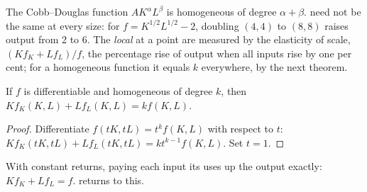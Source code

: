 The Cobb--Douglas function $AK^\alpha L^\beta$ is homogeneous of degree $\alpha + \beta$.
 need not be the same at every size: for
$f = K^{1/2}L^{1/2} - 2$, doubling $(4, 4)$ to $(8, 8)$ raises output from 2 to 6.
The \emph{local}  at a point are measured by the elasticity
of scale, $(Kf_K + Lf_L)/f$, the percentage rise of output when all inputs
rise by one per cent; for a homogeneous function it equals $k$ everywhere,
by the next theorem.

\begin{theorem}\label{thm:b1:technology:euler}
If $f$ is differentiable and homogeneous of degree $k$, then
$Kf_K(K, L) + Lf_L(K, L) = kf(K, L)$.
\end{theorem}

\begin{proof}
Differentiate $f(tK, tL) = t^kf(K, L)$ with respect to $t$:
$Kf_K(tK, tL) + Lf_L(tK, tL) = kt^{k-1}f(K, L)$. Set $t = 1$.
\end{proof}

With constant returns, paying each input its  uses up the
output exactly: $Kf_K + Lf_L = f$.  returns to
this.

